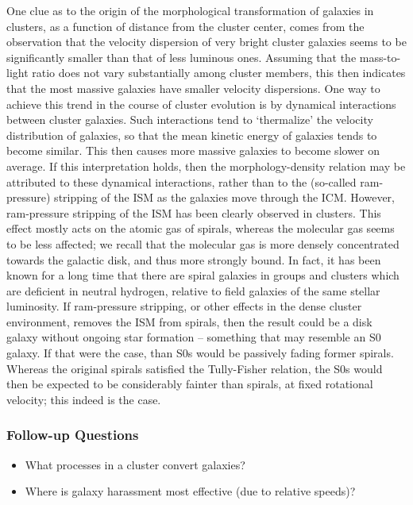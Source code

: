 \documentclass[a4paper,10pt]{article}
\begin{document}
{\noindent}One clue as to the origin of the morphological transformation of galaxies in clusters, as a function of distance from the cluster center, comes from the observation that the velocity dispersion of very bright cluster galaxies seems to be significantly smaller than that of less luminous ones. Assuming that the mass-to-light ratio does not vary substantially among cluster members, this then indicates that the most massive galaxies have smaller velocity dispersions. One way to achieve this trend in the course of cluster evolution is by dynamical interactions between cluster galaxies. Such interactions tend to `thermalize' the velocity distribution of galaxies, so that the mean kinetic energy of galaxies tends to become similar. This then causes more massive galaxies to become slower on average. If this interpretation holds, then the morphology-density relation may be attributed to these dynamical interactions, rather than to the (so-called ram-pressure) stripping of the ISM as the galaxies move through the ICM. However, ram-pressure stripping of the ISM has been clearly observed in clusters. This effect mostly acts on the atomic gas of spirals, whereas the molecular gas seems to be less affected; we recall that the molecular gas is more densely concentrated towards the galactic disk, and thus more strongly bound. In fact, it has been known for a long time that there are spiral galaxies in groups and clusters which are deficient in neutral hydrogen, relative to field galaxies of the same stellar luminosity. If ram-pressure stripping, or other effects in the dense cluster environment, removes the ISM from spirals, then the result could be a disk galaxy without ongoing star formation -- something that may resemble an S0 galaxy. If that were the case, than S0s would be passively fading former spirals. Whereas the original spirals satisfied the Tully-Fisher relation, the S0s would then be expected to be considerably fainter than spirals, at fixed rotational velocity; this indeed is the case.

\subsubsection{Follow-up Questions}

\begin{itemize}
    \item What processes in a cluster convert galaxies?
    \item Where is galaxy harassment most effective (due to relative speeds)?
\end{itemize}
\end{document}
